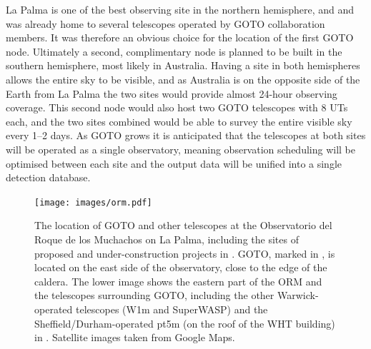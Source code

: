 \begin{colsection}
\begin{colsection}
La Palma is one of the best observing site in the northern hemisphere, and and was already home to several telescopes operated by GOTO collaboration members. It was therefore an obvious choice for the location of the first GOTO node. Ultimately a second, complimentary node is planned to be built in the southern hemisphere, most likely in Australia. Having a site in both hemispheres allows the entire sky to be visible, and as Australia is on the opposite side of the Earth from La Palma the two sites would provide almost 24-hour observing coverage. This second node would also host two GOTO telescopes with 8 UTs each, and the two sites combined would be able to survey the entire visible sky every 1--2 days. As GOTO grows it is anticipated that the telescopes at both sites will be operated as a single observatory, meaning observation scheduling will be optimised between each site and the output data will be unified into a single detection database.

\begin{figure}[p]
    \begin{center}
        \texttt{[image: images/orm.pdf]}
    \end{center}
    \caption[The location of GOTO and other telescopes on La Palma]{
        The location of GOTO and other telescopes at the Observatorio del Roque de los Muchachos on La Palma, including the sites of proposed and under-construction projects in . GOTO, marked in , is located on the east side of the observatory, close to the edge of the caldera. The lower image shows the eastern part of the ORM and the telescopes surrounding GOTO, including the other Warwick-operated telescopes (W1m and SuperWASP) and the Sheffield/Durham-operated pt5m (on the roof of the WHT building) in . Satellite images taken from Google Maps.
    }\label{fig:orm}
\end{figure}

\clearpage

\end{colsection}


\end{colsection}


\newpage
